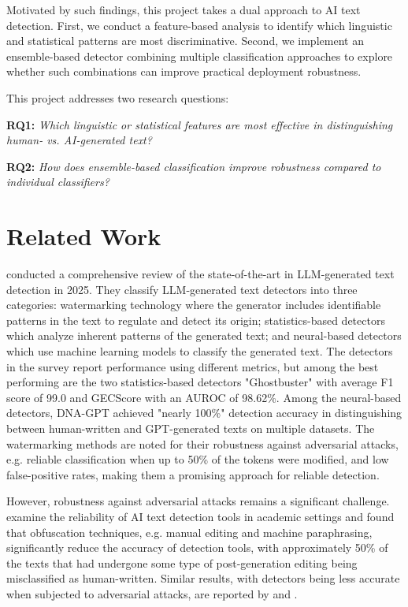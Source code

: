\documentclass[11pt]{article}
\begin{document}
Motivated by such findings, this project takes a dual approach to AI text detection. First, we conduct a feature-based analysis to identify which linguistic and statistical patterns are most discriminative. Second, we implement an ensemble-based detector combining multiple classification approaches to explore whether such combinations can improve practical deployment robustness.

This project addresses two research questions:

\textbf{RQ1:} \textit{Which linguistic or statistical features are most effective in distinguishing human- vs. AI-generated text?}

\textbf{RQ2:} \textit{How does ensemble-based classification improve robustness compared to individual classifiers?}

\section{Related Work}
\label{sec:related-work}
\citet{wu-etal-2025-survey} conducted a comprehensive review of the state-of-the-art in LLM-generated text detection in 2025. They classify LLM-generated text detectors into three categories: watermarking technology where the generator includes identifiable patterns in the text to regulate and detect its origin; statistics-based detectors which analyze inherent patterns of the generated text; and neural-based detectors which use machine learning models to classify the generated text. The detectors in the survey report performance using different metrics, but among the best performing are the two statistics-based detectors "Ghostbuster" with average F1 score of 99.0 and GECScore with an AUROC of 98.62\%. Among the neural-based detectors, DNA-GPT achieved "nearly 100\%" detection accuracy in distinguishing between human-written and GPT-generated texts on multiple datasets. The watermarking methods are noted for their robustness against adversarial attacks, e.g. reliable classification when up to 50\% of the tokens were modified, and low false-positive rates, making them a promising approach for reliable detection. 

However, robustness against adversarial attacks remains a significant challenge. \citet{weber-wulff_testing_2023} examine the reliability of AI text detection tools in academic settings and found that obfuscation techniques, e.g. manual editing and machine paraphrasing, significantly reduce the accuracy of detection tools, with approximately 50\% of the texts that had undergone some type of post-generation editing being misclassified as human-written. Similar results, with detectors being less accurate when subjected to adversarial attacks, are reported by \citet{wu-etal-2025-survey} and \citet{pudasaini_survey_2025}. 
\end{document}
